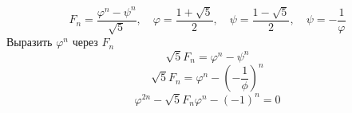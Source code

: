 \documentclass{article}
\begin{document}
\[
F_n = \frac{\varphi^n - \psi^n}{\sqrt{5}}, \quad
\varphi = \frac{1+\sqrt{5}}{2}, \quad
\psi = \frac{1-\sqrt{5}}{2}, \quad
\psi = -\frac{1}{\varphi}
\]
Выразить \(\varphi^n\) через \(F_n\)
\[
\sqrt{5}F_n=\varphi^n - \psi^n
\]
\[
\sqrt{5}F_n=\varphi^n - \left(-\frac{1}{\phi}\right)^n
\]
\[
\varphi^{2n} - \sqrt{5}F_n\varphi^n - (-1)^n = 0
\]
\end{document}
